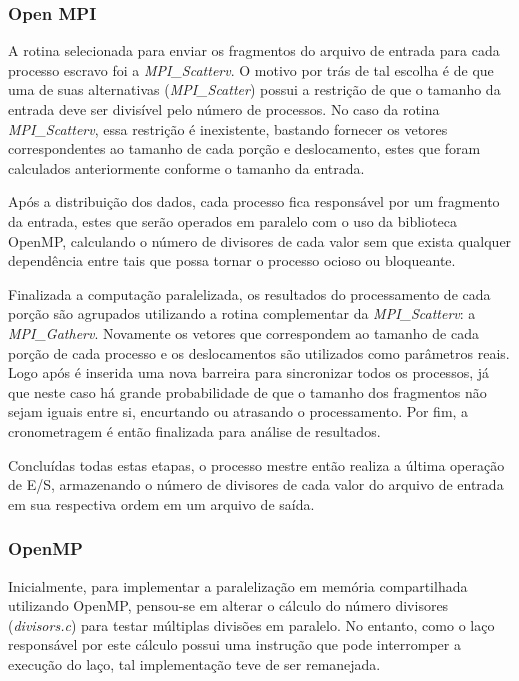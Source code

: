 \documentclass[a4paper, 12pt]{article}
\begin{document}
\subsubsection{Open MPI}

A rotina selecionada para enviar os fragmentos do arquivo de entrada para cada processo escravo foi a \emph{MPI\_Scatterv}. O motivo por trás de tal escolha é de que uma de suas alternativas (\emph{MPI\_Scatter}) possui a restrição de que o tamanho da entrada deve ser divisível pelo número de processos. No caso da rotina \emph{MPI\_Scatterv}, essa restrição é inexistente, bastando fornecer os vetores correspondentes ao tamanho de cada porção e deslocamento, estes que foram calculados anteriormente conforme o tamanho da entrada.

Após a distribuição dos dados, cada processo fica responsável por um fragmento da entrada, estes que serão operados em paralelo com o uso da biblioteca OpenMP, calculando o número de divisores de cada valor sem que exista qualquer dependência entre tais que possa tornar o processo ocioso ou bloqueante.

Finalizada a computação paralelizada, os resultados do processamento de cada porção são agrupados utilizando a rotina complementar da \emph{MPI\_Scatterv}: a \emph{MPI\_Gatherv}. Novamente os vetores que correspondem ao tamanho de cada porção de cada processo e os deslocamentos são utilizados como parâmetros reais. Logo após é inserida uma nova barreira para sincronizar todos os processos, já que neste caso há grande probabilidade de que o tamanho dos fragmentos não sejam iguais entre si, encurtando ou atrasando o processamento. Por fim, a cronometragem é então finalizada para análise de resultados.

Concluídas todas estas etapas, o processo mestre então realiza a última operação de E/S, armazenando o número de divisores de cada valor do arquivo de entrada em sua respectiva ordem em um arquivo de saída.

\subsubsection{OpenMP}

Inicialmente, para implementar a paralelização em memória compartilhada utilizando OpenMP, pensou-se em alterar o cálculo do número divisores (\textit{divisors.c}) para testar múltiplas divisões em paralelo. No entanto, como o laço responsável por este cálculo possui uma instrução que pode interromper a execução do laço, tal implementação teve de ser remanejada.
\end{document}

